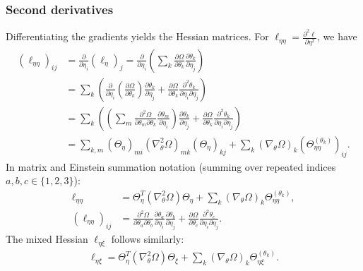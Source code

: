 \documentclass{article}
\begin{document}
\subsubsection{Second derivatives}

Differentiating the gradients yields the Hessian matrices.
For $\ell_{\eta\eta} = \frac{\partial^2 \ell}{\partial \eta^2}$, we have
%
\begin{align}
  (\ell_{\eta\eta})_{ij} & = \frac{\partial}{\partial \eta_i} (\ell_\eta)_j = \frac{\partial}{\partial \eta_i} \left( \sum_k \frac{\partial \Omega}{\partial \theta_k} \frac{\partial \theta_k}{\partial \eta_j} \right)                                                                                                           \\
                         & = \sum_k \left( \frac{\partial}{\partial \eta_i}\left(\frac{\partial \Omega}{\partial \theta_k}\right) \frac{\partial \theta_k}{\partial \eta_j} + \frac{\partial \Omega}{\partial \theta_k} \frac{\partial^2 \theta_k}{\partial \eta_i \partial \eta_j} \right)                                        \\
                         & = \sum_k \left( \left( \sum_m \frac{\partial^2 \Omega}{\partial \theta_m \partial \theta_k} \frac{\partial \theta_m}{\partial \eta_i} \right) \frac{\partial \theta_k}{\partial \eta_j} + \frac{\partial \Omega}{\partial \theta_k} \frac{\partial^2 \theta_k}{\partial \eta_i \partial \eta_j} \right) \\
                         & = \sum_{k,m} (\Theta_\eta)_{mi} (\nabla_\theta^2 \Omega)_{mk} (\Theta_\eta)_{kj} + \sum_k (\nabla_\theta \Omega)_k (\Theta_{\eta\eta}^{(\theta_k)})_{ij}.
\end{align}
%
In matrix and Einstein summation notation (summing over repeated indices $a, b, c \in \{1,2,3\}$):
%
\begin{align}
  \ell_{\eta \eta}       & = \Theta_{\eta}^{T} (\nabla_\theta^2 \Omega) \Theta_\eta + \sum_k (\nabla_\theta \Omega)_{k}   \Theta_{\eta\eta}^{(\theta_k)},                                                                                                                               \\
  (\ell_{\eta\eta})_{ij} & = \frac{\partial^2 \Omega}{\partial \theta_a \partial \theta_b} \frac{\partial \theta_a}{\partial \eta_i} \frac{\partial \theta_b}{\partial \eta_j} + \frac{\partial \Omega}{\partial \theta_c} \frac{\partial^2 \theta_c}{\partial \eta_i \partial \eta_j}.
\end{align}
%
The mixed Hessian $\ell_{\eta\xi}$ follows similarly:
%
\begin{align}
  \ell_{\eta \xi} = \Theta_{\eta}^{T} (\nabla_\theta^2 \Omega) \Theta_\xi + \sum_k (\nabla_\theta \Omega)_{k}   \Theta_{\eta\xi}^{(\theta_k)}.
\end{align}
\end{document}
